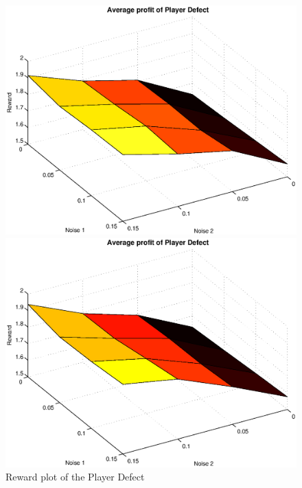 \documentclass[11pt,twoside]{article}
\begin{document}
\begin{figure}[h]

\begin{minipage}[hbt]{0.65\textwidth}
	\centering
	\includegraphics[width=\textwidth]{pics/simulation1/Reward_vs_Noise_of_Player_Defect}
\end{minipage}
\hfill
\begin{minipage}[hbt]{0.3\textwidth}
	\centering
	\includegraphics[width=\textwidth]{pics/simulation2/Reward_vs_Noise_of_Player_Defect}
\end{minipage}
	\caption{Reward plot of the Player Defect}
	\label{pic player xxx}
\end{figure}
\end{document}
